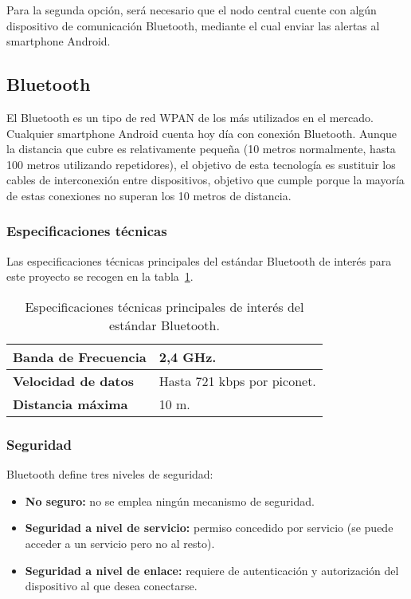 Para la segunda opción, será necesario que el nodo central cuente con algún dispositivo de comunicación Bluetooth, mediante el cual enviar las alertas al smartphone Android.

    \subsection{Bluetooth}
        El Bluetooth es un tipo de red WPAN de los más utilizados en el mercado. Cualquier smartphone Android cuenta hoy día con conexión Bluetooth. Aunque la distancia que cubre es relativamente pequeña (10 metros normalmente, hasta 100 metros utilizando repetidores), el objetivo de esta tecnología es sustituir los cables de interconexión entre dispositivos, objetivo que cumple porque la mayoría de estas conexiones no superan los 10 metros de distancia.

        \subsubsection{Especificaciones técnicas}
        Las especificaciones técnicas principales del estándar Bluetooth de interés para este proyecto se recogen en la tabla~\ref{tab:bluetooth}.

        \begin{table}[!ht]
            \centering
            {
            \begin{tabularx}{\textwidth}{|l|X|}
                \hline
                \textbf{Banda de Frecuencia} & 2,4 GHz. \\ \hline
                \textbf{Velocidad de datos} & Hasta 721 kbps por piconet. \\ \hline
                \textbf{Distancia máxima} & 10 m. \\ \hline
            \end{tabularx}
            }
            \caption{Especificaciones técnicas principales de interés del estándar Bluetooth.}
            \label{tab:bluetooth}
        \end{table}

        \subsubsection{Seguridad}
        Bluetooth define tres niveles de seguridad:

        \begin{itemize}
            \item \textbf{No seguro:} no se emplea ningún mecanismo de seguridad.
            \item \textbf{Seguridad a nivel de servicio:} permiso concedido por servicio (se puede acceder a un servicio pero no al resto).
            \item \textbf{Seguridad a nivel de enlace:} requiere de autenticación y autorización del dispositivo al que desea conectarse.
        \end{itemize}

